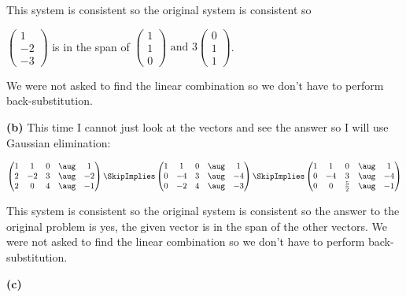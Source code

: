 \documentclass[oneside,12pt]{amsart}
\begin{document}
\bigskip

This system is consistent so the original system is consistent so

$
\begin{pmatrix}
1 \\ -2 \\ -3
\end{pmatrix}
$
is in the span of
$
\begin{pmatrix}
1 \\ 1 \\ 0
\end{pmatrix}
\text{ and }
3
\begin{pmatrix}
0 \\ 1 \\ 1
\end{pmatrix}
$.

\bigskip

We were not asked to find the linear combination so we don't have
to perform back-substitution.

\bigskip

\textbf{(b)} This time I cannot just look at the vectors and see the answer
so I will use Gaussian elimination:

\bigskip

$
\begin{pmatrix}
1 & 1  & 0 & \aug &   1 \\
2 & -2 & 3 & \aug &  -2 \\
2 & 0  & 4 & \aug &  -1 \\
\end{pmatrix}
\SkipImplies
\begin{pmatrix}
1 & 1 & 0  & \aug & 1 \\
0 & -4 & 3 & \aug & -4 \\
0 & -2 & 4 & \aug & -3
\end{pmatrix}
\SkipImplies
\begin{pmatrix}
1 & 1  & 0           & \aug & 1 \\
0 & -4 & 3           & \aug & -4 \\
0 & 0  & \frac{5}{2} & \aug & -1
\end{pmatrix}
$

This system is consistent so the original system is consistent so the answer
to the original problem is yes, the given vector is in the span of the other
vectors. We were not asked to find the linear combination so we don't have
to perform back-substitution.

\bigskip

\textbf{(c)}
\end{document}
